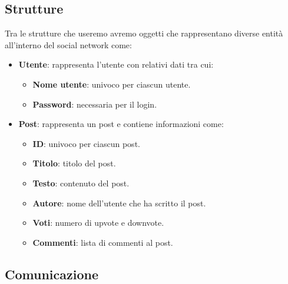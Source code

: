 \subsection{Strutture}
Tra le strutture che useremo avremo oggetti che rappresentano diverse entit\`a all'interno del social network come:
\begin{itemize}
	\item \textbf{Utente}: rappresenta l'utente con relativi dati tra cui:
	      \begin{itemize}
		      \item \textbf{Nome utente}: univoco per ciascun utente.
		      \item \textbf{Password}: necessaria per il login.
	      \end{itemize}
	\item \textbf{Post}: rappresenta un post e contiene informazioni come:
	      \begin{itemize}
		      \item \textbf{ID}: univoco per ciascun post.
		      \item \textbf{Titolo}: titolo del post.
		      \item \textbf{Testo}: contenuto del post.
		      \item \textbf{Autore}: nome dell'utente che ha scritto il post.
		      \item \textbf{Voti}: numero di upvote e downvote.
		      \item \textbf{Commenti}: lista di commenti al post.
	      \end{itemize}
\end{itemize}

\subsection{Comunicazione}
